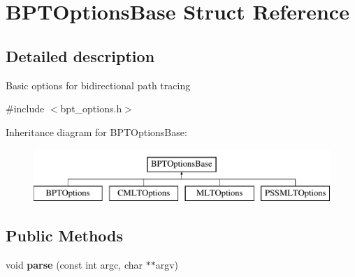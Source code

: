 \hypertarget{struct_b_p_t_options_base}{}\section{B\+P\+T\+Options\+Base Struct Reference}
\label{struct_b_p_t_options_base}


\subsection{Detailed description}
Basic options for bidirectional path tracing 

{\ttfamily \#include $<$bpt\+\_\+options.\+h$>$}

Inheritance diagram for B\+P\+T\+Options\+Base\+:\begin{figure}[H]
\begin{center}
\leavevmode
\includegraphics[height=2.000000cm]{struct_b_p_t_options_base}
\end{center}
\end{figure}
\subsection*{Public Methods}
\begin{DoxyCompactItemize}
\item 
\mbox{\label{struct_b_p_t_options_base_a5a189940377e81d15c6dfc02c6465dcc}} 
void {\bfseries parse} (const int argc, char $\ast$$\ast$argv)
\end{DoxyCompactItemize}
